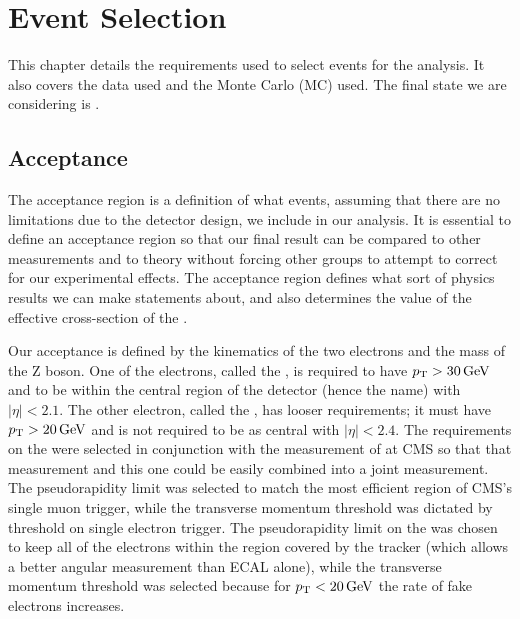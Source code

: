 \chapter{Event Selection}
\label{event_selection_chapter}

This chapter details the requirements used to select events for the analysis.
It also covers the data used and the Monte Carlo (MC) used. The final state we
are considering is \Ztoee.

\section{Acceptance}

The acceptance region is a definition of what events, assuming that there are
no limitations due to the detector design, we include in our analysis. It is
essential to define an acceptance region so that our final result can be
compared to other measurements and to theory without forcing other groups to
attempt to correct for our experimental effects. The acceptance region defines
what sort of physics results we can make statements about, and also determines
the value of the effective cross-section of the \Z.

Our acceptance is defined by the kinematics of the two electrons and the mass
of the Z boson. One of the electrons, called the \CentralElectron, is required
to have $p_{\mathrm{T}} > 30 \,\text{Ge\hspace{-.08em}V}$ and to be within the central region of the detector
(hence the name) with $|\eta| < 2.1$. The other electron, called the
\ExtendedElectron, has looser requirements; it must have $p_{\mathrm{T}} > 20 \,\text{Ge\hspace{-.08em}V}$ and is
not required to be as central with $|\eta| < 2.4$. The requirements on the
\CentralElectron were selected in conjunction with the \Ztomumu measurement of
\phistar at CMS so that that measurement and this one could be easily combined
into a joint measurement. The pseudorapidity limit was selected to match the
most efficient region of CMS's single muon trigger, while the transverse
momentum threshold was dictated by threshold on single electron trigger. The
pseudorapidity limit on the \ExtendedElectron was chosen to keep all of the
electrons within the region covered by the tracker (which allows a better
angular measurement than ECAL alone), while the transverse momentum threshold
was selected because for $p_{\mathrm{T}} < 20 \,\text{Ge\hspace{-.08em}V}$ the rate of fake electrons increases.

